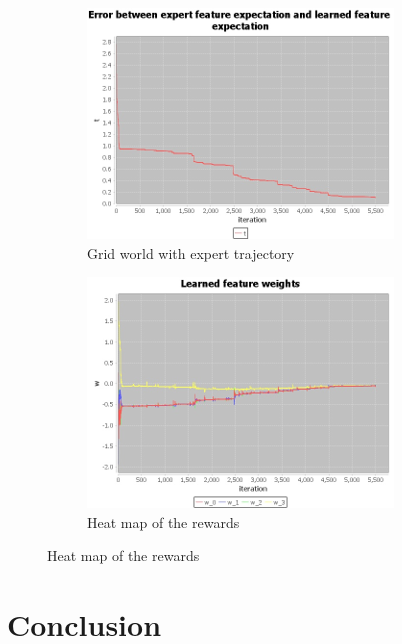 \documentclass[10pt,a4paper,twocolumn]{article}
\begin{document}
\begin{figure}
\begin{subfigure}[b]{0.5\textwidth}
	\includegraphics[width=\textwidth]{experiment_2_t}
	\caption{Grid world with expert trajectory}
	\label{fig:experiment1t}
\end{subfigure}
\begin{subfigure}[b]{0.5\textwidth}
	\includegraphics[width=\textwidth]{experiment_2_w}
	\caption{Heat map of the rewards}
	\label{fig:experiment1w}
\end{subfigure}
\end{figure}



\section{Conclusion}

 

\end{document}
